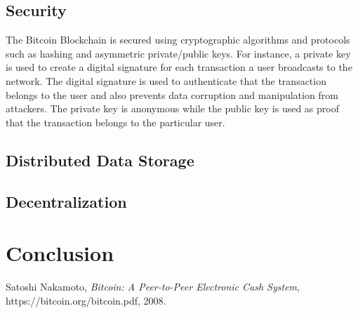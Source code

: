 \documentclass[report]{IEEEtran}
\begin{document}
\subsection{Security}
The Bitcoin Blockchain is secured using cryptographic algorithms and protocols such as hashing and asymmetric private/public keys. For instance, a private key is used to create a digital signature for each transaction a user broadcasts to the network. The digital signature is used to authenticate that the transaction belongs to the user and also prevents data corruption and manipulation from attackers. The private key is anonymous while the public key is used as proof that the transaction belongs to the particular user. 
\subsection{Distributed Data Storage}
\subsection{Decentralization}
\section{Conclusion}

\begin{thebibliography}{1}

Satoshi Nakamoto, \emph{Bitcoin: A Peer-to-Peer Electronic Cash System}, https://bitcoin.org/bitcoin.pdf, 2008.

\end{thebibliography}
\end{document}
